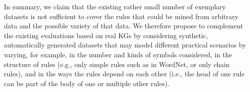 In summary, we claim that the existing rather small number of exemplary datasets is not sufficient to cover the rules that could be mined from arbitrary data and the possible variety of that data. We therefore propose to complement the existing evaluations based on real KGs by considering synthetic, automatically generated datasets that may model different practical scenarios by varying, for example, in the number and kinds of symbols considered, in the structure of rules (e.g., only simple rules such as in WordNet, or only chain rules), and in the ways the rules depend on each other (i.e., the head of one rule can be part of the body of one or multiple other rules).


% 



